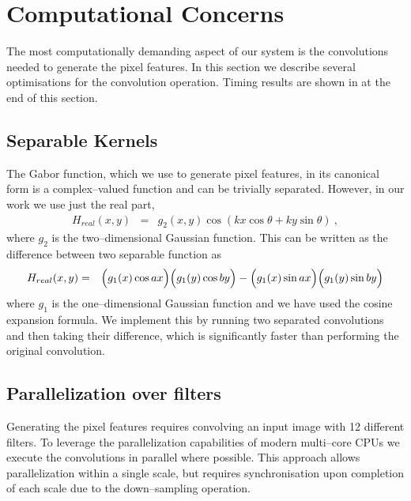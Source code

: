 \section{Computational Concerns}
The most computationally demanding aspect of our system is the
convolutions needed to generate the pixel features. In this section we
describe several optimisations for the convolution operation. Timing
results are shown in  at the end of this
section.

\subsection{Separable Kernels}
The Gabor function, which we use to generate pixel features, in its
canonical form is a complex--valued function and can be trivially
separated. However, in our work we use just the real part,
\begin{eqnarray}
  H_{real}(x,y) & = & g_2(x,y) \cos(kx\cos\theta + ky\sin\theta) ~,
\end{eqnarray}
where $g_2$ is the two--dimensional Gaussian
function. This can be written as the difference between two separable
function as
\begin{eqnarray}
   H_{real}(x,y) & = & \Bigl(g_1(x)\cos ax\Bigr) \Bigl(g_1(y)\cos by\Bigr)
      - \Bigl(g_1(x)\sin ax\Bigr)\Bigl(g_1(y)\sin by\Bigr)
\end{eqnarray}
where $g_1$ is the one--dimensional Gaussian function and we have used
the cosine expansion formula. We implement this by running two
separated convolutions and then taking their difference, which is
significantly faster than performing the original convolution.

\subsection{Parallelization over filters}
Generating the pixel features requires convolving an input image with
12 different filters. To leverage the parallelization capabilities of
modern multi--core CPUs we execute the convolutions in parallel where
possible. This approach allows parallelization within a single scale,
but requires synchronisation upon completion of each scale due to the
down--sampling operation.


